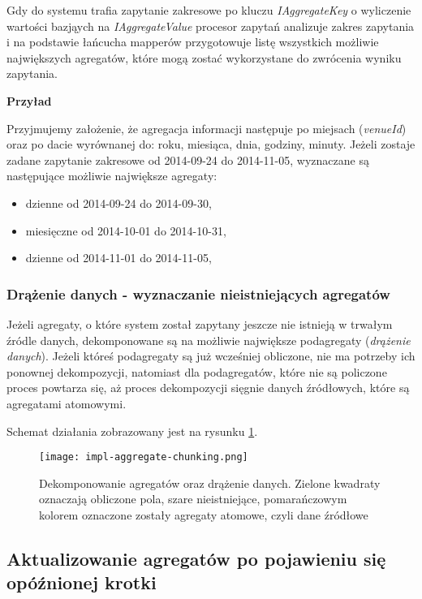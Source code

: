 Gdy do systemu trafia zapytanie zakresowe po kluczu \emph{IAggregateKey} o wyliczenie wartości bazjąych na \emph{IAggregateValue} procesor zapytań analizuje zakres zapytania i na podstawie łańcucha mapperów przygotowuje listę wszystkich możliwie największych agregatów, które mogą zostać wykorzystane do zwrócenia wyniku zapytania.

\textbf{Przyład}

Przyjmujemy założenie, że agregacja informacji następuje po miejsach (\emph{venueId}) oraz po dacie wyrównanej do: roku, miesiąca, dnia, godziny, minuty. Jeżeli zostaje zadane zapytanie zakresowe od 2014-09-24 do 2014-11-05, wyznaczane są następujące możliwie największe agregaty:

\begin{itemize}[noitemsep]
  \item dzienne od 2014-09-24 do 2014-09-30,
  \item miesięczne od 2014-10-01 do 2014-10-31,
  \item dzienne od 2014-11-01 do 2014-11-05,
\end{itemize}

\subsubsection{Drążenie danych - wyznaczanie nieistniejących agregatów}
\label{sec:impl-mal-computing-aggregates}

Jeżeli agregaty, o które system został zapytany jeszcze nie istnieją w trwałym źródle danych, dekomponowane są na możliwie największe podagregaty (\emph{drążenie danych}). Jeżeli któreś podagregaty są już wcześniej obliczone, nie ma potrzeby ich ponownej dekompozycji, natomiast dla podagregatów, które nie są policzone proces powtarza się, aż proces dekompozycji sięgnie danych źródłowych, które są agregatami atomowymi.

Schemat działania zobrazowany jest na rysunku \ref{fig:impl-aggregate-chunking}.

\begin{figure}[h!]
  \centering
    \texttt{[image: impl-aggregate-chunking.png]}
  \caption{Dekomponowanie agregatów oraz drążenie danych. Zielone kwadraty oznaczają obliczone pola, szare nieistniejące, pomarańczowym kolorem oznaczone zostały agregaty atomowe, czyli dane źródłowe}
  \label{fig:impl-aggregate-chunking}
\end{figure}

\subsection{Aktualizowanie agregatów po pojawieniu się opóźnionej krotki}

